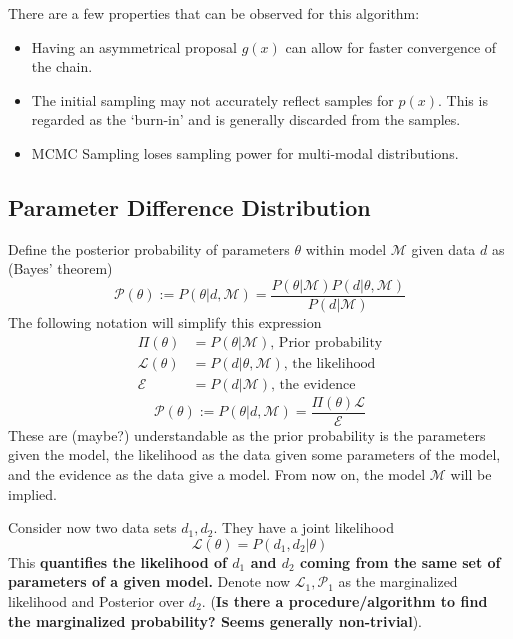 There are a few properties that can be observed for this algorithm:
\begin{itemize}
    \item Having an asymmetrical proposal $g(x)$ can allow for faster convergence of the chain.
    \item The initial sampling may not accurately reflect samples for $p(x)$. This is regarded as the `burn-in' and is generally discarded from the samples.
    \item MCMC Sampling loses sampling power for multi-modal distributions. 
\end{itemize}

\subsection{Parameter Difference Distribution}
Define the posterior probability of parameters $\theta$ within model $\mathcal{M}$ given data $d$ as (Bayes' theorem)
\begin{equation}
    \mathcal{P}(\theta) := P(\theta|d,\mathcal{M}) = \frac{P(\theta|\mathcal{M})P(d|\theta,\mathcal{M})}{P(d|\mathcal{M})}
\end{equation}
The following notation will simplify this expression
\begin{equation*}
    \begin{split}
        \Pi(\theta) &= P(\theta|\mathcal{M}) \text{, Prior probability} \\
        \mathcal{L}(\theta) &= P(d|\theta,\mathcal{M}) \text{, the likelihood} \\
        \mathcal{E} &= P(d|\mathcal{M}) \text{, the evidence}
    \end{split}
\end{equation*}
\[ \mathcal{P}(\theta) := P(\theta|d,\mathcal{M}) = \frac{\Pi(\theta)\mathcal{L}}{\mathcal{E}} \]
These are (maybe?) understandable as the prior probability is the parameters given the model, the likelihood as the data given some parameters of the model, and the evidence as the data give a model. From now on, the model $\mathcal{M}$ will be implied.

Consider now two data sets $d_1,d_2$. They have a joint likelihood 
\[ \mathcal{L}(\theta) = P(d_1,d_2|\theta) \]
This \textbf{quantifies the likelihood of $d_1$ and $d_2$ coming from the same set of parameters of a given model.} Denote now $\mathcal{L}_1,\mathcal{P}_1$ as the marginalized likelihood and Posterior over $d_2$. (\textbf{Is there a procedure/algorithm to find the marginalized probability? Seems generally non-trivial}).


